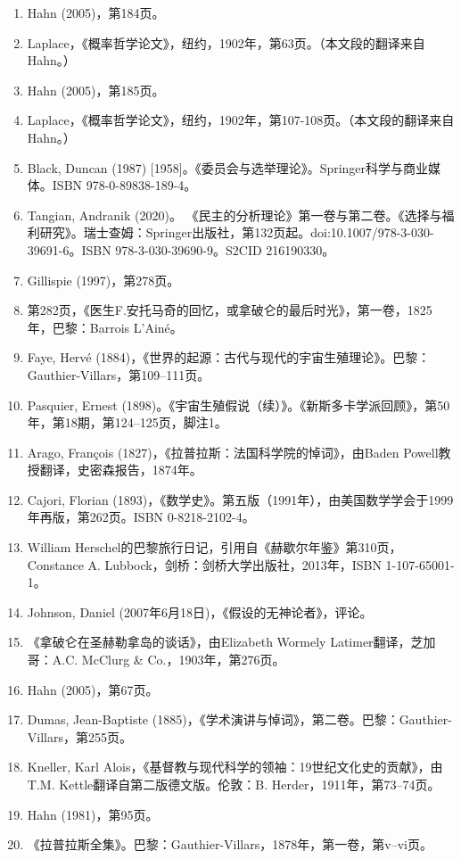 \begin{enumerate}
\item Hahn (2005)，第184页。
\item Laplace，《概率哲学论文》，纽约，1902年，第63页。（本文段的翻译来自Hahn。）  
\item Hahn (2005)，第185页。  
\item Laplace，《概率哲学论文》，纽约，1902年，第107-108页。（本文段的翻译来自Hahn。）  
\item Black, Duncan (1987) [1958]。《委员会与选举理论》。Springer科学与商业媒体。ISBN 978-0-89838-189-4。  
\item Tangian, Andranik (2020)。 《民主的分析理论》第一卷与第二卷。《选择与福利研究》。瑞士查姆：Springer出版社，第132页起。doi:10.1007/978-3-030-39691-6。ISBN 978-3-030-39690-9。S2CID 216190330。  
\item Gillispie (1997)，第278页。  
\item 第282页，《医生F.安托马奇的回忆，或拿破仑的最后时光》，第一卷，1825年，巴黎：Barrois L'Ainé。  
\item Faye, Hervé (1884)，《世界的起源：古代与现代的宇宙生殖理论》。巴黎：Gauthier-Villars，第109–111页。  
\item Pasquier, Ernest (1898)。《宇宙生殖假说（续）》。《新斯多卡学派回顾》，第50年，第18期，第124–125页，脚注1。
\item Arago, François (1827)，《拉普拉斯：法国科学院的悼词》，由Baden Powell教授翻译，史密森报告，1874年。  
\item Cajori, Florian (1893)，《数学史》。第五版（1991年），由美国数学学会于1999年再版，第262页。ISBN 0-8218-2102-4。  
\item William Herschel的巴黎旅行日记，引用自《赫歇尔年鉴》第310页，Constance A. Lubbock，剑桥：剑桥大学出版社，2013年，ISBN 1-107-65001-1。  
\item Johnson, Daniel (2007年6月18日)，《假设的无神论者》，评论。  
\item 《拿破仑在圣赫勒拿岛的谈话》，由Elizabeth Wormely Latimer翻译，芝加哥：A.C. McClurg & Co.，1903年，第276页。  
\item Hahn (2005)，第67页。  
\item Dumas, Jean-Baptiste (1885)，《学术演讲与悼词》，第二卷。巴黎：Gauthier-Villars，第255页。  
\item Kneller, Karl Alois，《基督教与现代科学的领袖：19世纪文化史的贡献》，由T.M. Kettle翻译自第二版德文版。伦敦：B. Herder，1911年，第73–74页。  
\item Hahn (1981)，第95页。  
\item 《拉普拉斯全集》。巴黎：Gauthier-Villars，1878年，第一卷，第v–vi页。

\end{enumerate}
